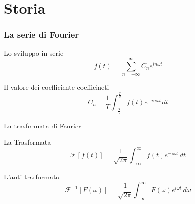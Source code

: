 
	\section{Storia} %
		\label{sec:il_formalismo_di_fourier}
	
		\begin{frame}[c]\frametitle{La serie di Fourier}

		\begin{block}{Lo sviluppo in serie}
			\begin{equation}
		    	\label{eq:serie_di_fourier}
				f\left(t\right)=\sum_{n=-\infty}^{\infty} C_n e^{i n \omega t}
			\end{equation}
		\end{block}
		\pause
		\begin{block}{Il valore dei coefficiente coefficineti}
			\begin{equation}
			    \label{eq:coefficienti}
					C_n= \frac{1}{T} \int_{-\frac{T}{2}}^{\frac{T}{2}} f\left(t\right) e^{-i n \omega t} \,dt
			\end{equation}
		\end{block}

		\end{frame}
		
		\begin{frame}{La trasformata di Fourier}
		
			\begin{block}{La Trasformata}
				\begin{equation}
					\mathcal{F} \left [ f \left ( t\right)\right ] =\frac{1}{\sqrt{2\pi}} \int_{-\infty}^{\infty} f \left ( t \right ) e^{-i \omega t} \, dt
				\end{equation}		
			\end{block}	

			\pause
			
			\begin{block}{L'anti trasformata}
				\begin{equation}
				    \label{eq:antitrasformata}
					\mathcal{F}^{-1} \left [ F \left ( \omega \right)\right ] =\frac{1}{\sqrt{2\pi}} \int_{-\infty}^{\infty} F \left ( \omega \right ) e^{i \omega t} \, d\omega
				\end{equation}
			\end{block}
		
		\end{frame}
		

